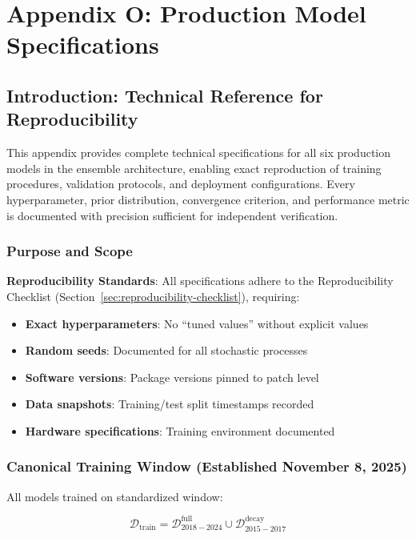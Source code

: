 \chapter{Appendix O: Production Model Specifications}
\label{app:model-specifications}

\section{Introduction: Technical Reference for Reproducibility}

This appendix provides complete technical specifications for all six production models in the ensemble architecture, enabling exact reproduction of training procedures, validation protocols, and deployment configurations. Every hyperparameter, prior distribution, convergence criterion, and performance metric is documented with precision sufficient for independent verification.

\subsection{Purpose and Scope}

\textbf{Reproducibility Standards}: All specifications adhere to the Reproducibility Checklist (Section~\ref{sec:reproducibility-checklist}), requiring:

\begin{itemize}
\item \textbf{Exact hyperparameters}: No ``tuned values'' without explicit values
\item \textbf{Random seeds}: Documented for all stochastic processes
\item \textbf{Software versions}: Package versions pinned to patch level
\item \textbf{Data snapshots}: Training/test split timestamps recorded
\item \textbf{Hardware specifications}: Training environment documented
\end{itemize}

\subsection{Canonical Training Window (Established November 8, 2025)}

All models trained on standardized window:

\begin{equation}
\mathcal{D}_{\text{train}} = \mathcal{D}_{2018-2024}^{\text{full}} \cup \mathcal{D}_{2015-2017}^{\text{decay}}
\end{equation}

